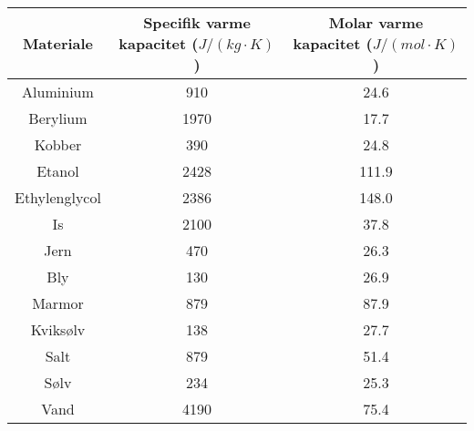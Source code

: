 \begin{tabular}{|c|c|c|}
	\hline
	Materiale&Specifik varme kapacitet ($J/(kg\cdot K)$)&Molar varme kapacitet ($J/(mol\cdot K)$)\\
	\hline
	Aluminium&910&24.6\\
	Berylium&1970&17.7\\
	Kobber&390&24.8\\
	Etanol&2428&111.9\\
	Ethylenglycol&2386&148.0\\
	Is&2100&37.8\\
	Jern&470&26.3\\
	Bly&130&26.9\\
	Marmor&879&87.9\\
	Kviksølv&138&27.7\\
	Salt&879&51.4\\
	Sølv&234&25.3\\
	Vand&4190&75.4\\
	\hline
\end{tabular}